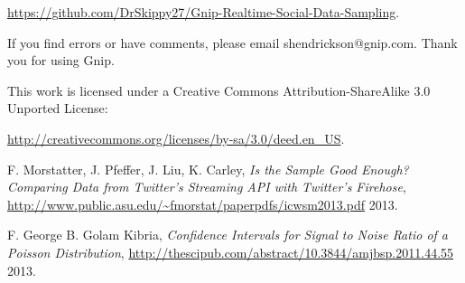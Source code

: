 \documentclass{article}
\begin{document}
\noindent \url{https://github.com/DrSkippy27/Gnip-Realtime-Social-Data-Sampling}.

If you find errors
or have comments, please email shendrickson@gnip.com. Thank you for using Gnip.

This work is licensed under a Creative Commons Attribution-ShareAlike 3.0 Unported License:


\noindent \url{http://creativecommons.org/licenses/by-sa/3.0/deed.en_US}.


\begin{thebibliography}{2013}

 F. Morstatter, J. Pfeffer, J. Liu, K. Carley, \textsl{Is the Sample Good Enough? Comparing Data from Twitter’s Streaming API with Twitter’s Firehose}, \url{http://www.public.asu.edu/~fmorstat/paperpdfs/icwsm2013.pdf} 2013.

 F. George B. Golam Kibria, \textsl{Confidence Intervals for Signal to Noise Ratio of
a Poisson Distribution}, \url{http://thescipub.com/abstract/10.3844/amjbsp.2011.44.55} 2013.

\end{thebibliography}
\end{document}
